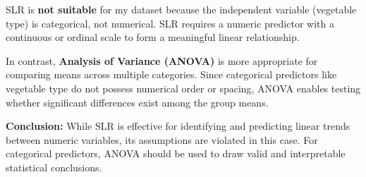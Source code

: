 \documentclass{article}
\begin{document}
SLR is \textbf{not suitable} for my dataset because the independent variable (vegetable type) is categorical, not numerical. SLR requires a numeric predictor with a continuous or ordinal scale to form a meaningful linear relationship.

In contrast, \textbf{Analysis of Variance (ANOVA)} is more appropriate for comparing means across multiple categories. Since categorical predictors like vegetable type do not possess numerical order or spacing, ANOVA enables testing whether significant differences exist among the group means.

\textbf{Conclusion:} While SLR is effective for identifying and predicting linear trends between numeric variables, its assumptions are violated in this case. For categorical predictors, ANOVA should be used to draw valid and interpretable statistical conclusions.
\end{document}
